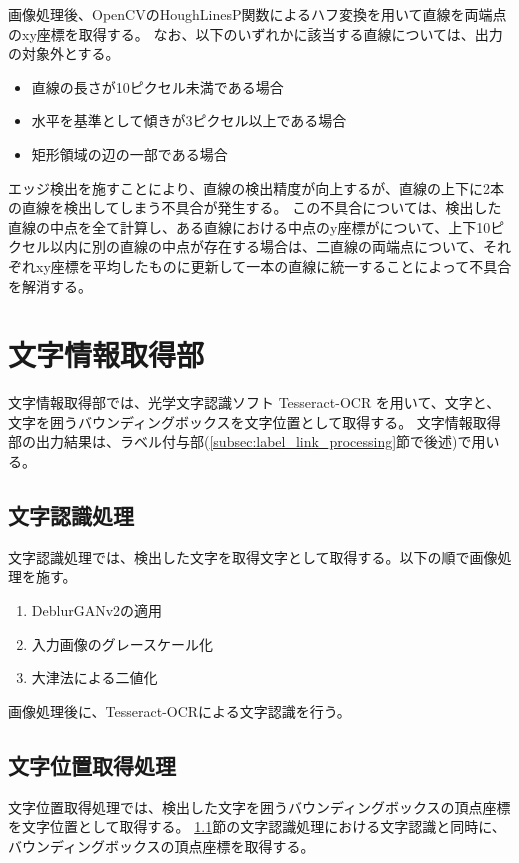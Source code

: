 画像処理後、OpenCVのHoughLinesP関数によるハフ変換を用いて直線を両端点のxy座標を取得する。
なお、以下のいずれかに該当する直線については、出力の対象外とする。

\begin{itemize}
    \item 直線の長さが10ピクセル未満である場合
    \item 水平を基準として傾きが3ピクセル以上である場合
    \item 矩形領域の辺の一部である場合
\end{itemize}

エッジ検出を施すことにより、直線の検出精度が向上するが、直線の上下に2本の直線を検出してしまう不具合が発生する。
この不具合については、検出した直線の中点を全て計算し、ある直線における中点のy座標がについて、上下10ピクセル以内に別の直線の中点が存在する場合は、二直線の両端点について、それぞれxy座標を平均したものに更新して一本の直線に統一することによって不具合を解消する。



\section{文字情報取得部}\label{sec:OCR_part}
文字情報取得部では、光学文字認識ソフト Tesseract-OCR を用いて、文字と、文字を囲うバウンディングボックスを文字位置として取得する。
文字情報取得部の出力結果は、ラベル付与部(\ref{subsec:label_link_processing}節で後述)で用いる。

\subsection{文字認識処理}\label{subsec:char_recognition_processing}
文字認識処理では、検出した文字を取得文字として取得する。以下の順で画像処理を施す。

\begin{enumerate}
    \item DeblurGANv2の適用
    \item 入力画像のグレースケール化
    \item 大津法による二値化
\end{enumerate}

画像処理後に、Tesseract-OCRによる文字認識を行う。

\subsection{文字位置取得処理}\label{subsec:char_position_obtainment_processing}
文字位置取得処理では、検出した文字を囲うバウンディングボックスの頂点座標を文字位置として取得する。
\ref{subsec:char_recognition_processing}節の文字認識処理における文字認識と同時に、バウンディングボックスの頂点座標を取得する。

